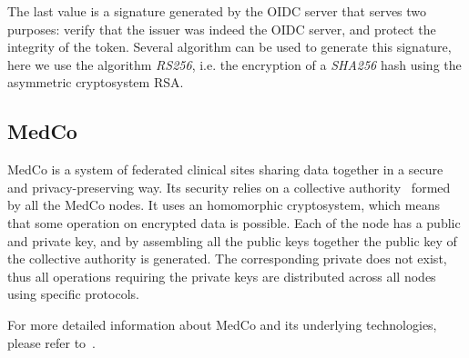 The last value is a signature generated by the OIDC server that serves two purposes: verify that the issuer was indeed the OIDC server, and protect the integrity of the token.
Several algorithm can be used to generate this signature, here we use the algorithm \emph{RS256}, i.e. the encryption of a \emph{SHA256} hash using the asymmetric cryptosystem RSA.


\subsection{MedCo}
\label{sec:bg-medco}

MedCo is a system of federated clinical sites sharing data together in a secure and privacy-preserving way.
Its security relies on a collective authority~\cite{syta2015certificate} formed by all the MedCo nodes.
It uses an homomorphic cryptosystem, which means that some operation on encrypted data is possible. 
Each of the node has a public and private key, and by assembling all the public keys together the public key of the collective authority is generated.
The corresponding private does not exist, thus all operations requiring the private keys are distributed across all nodes using specific protocols.

For more detailed information about MedCo and its underlying technologies, please refer to~\cite{medco}.
